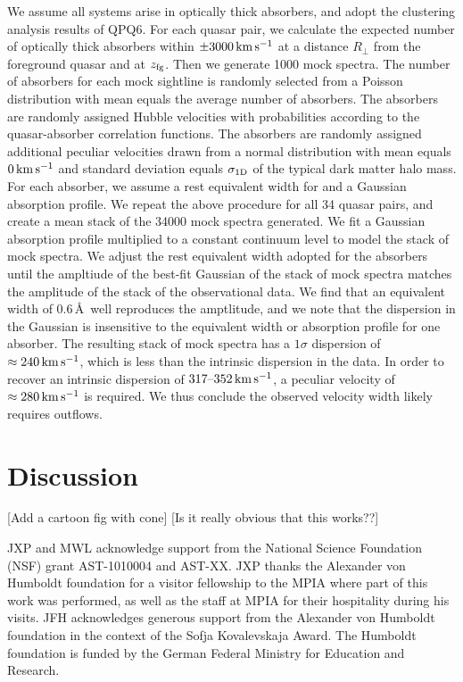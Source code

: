 \documentclass[iop]{emulateapj}
\begin{document}
We assume all  
systems arise in optically thick absorbers, and adopt the clustering analysis results of QPQ6. For 
each quasar pair, we calculate the expected number of optically thick absorbers within 
$\pm3000\,{\rm km\,s^{-1}}$ at a distance $R_\perp$ from the foreground quasar and at 
$z_{\rm fg}$. Then we generate 1000 mock spectra. The number of absorbers for each mock sightline 
is randomly selected from a Poisson distribution with mean equals the average number of absorbers. 
The absorbers are randomly assigned Hubble velocities with probabilities according to the 
quasar-absorber correlation functions. The absorbers are randomly assigned additional peculiar 
velocities drawn from a normal distribution with mean equals $0\,{\rm km\,s^{-1}}$ and standard 
deviation equals $\sigma_{\rm 1D}$ of the typical dark matter halo mass. For each absorber, we 
assume a rest equivalent width for  and a Gaussian absorption profile. We repeat the 
above procedure for all 34 quasar pairs, and create a mean stack of the 34000 mock spectra 
generated. We fit a Gaussian absorption profile multiplied to a constant continuum level to model 
the stack of mock spectra. We adjust the rest equivalent width adopted for the  
absorbers until the ampltiude of the best-fit Gaussian of the stack of mock spectra matches the 
amplitude of the stack of the observational data. We find that an equivalent width of 0.6\,\AA \ 
well reproduces the amptlitude, and we note that the dispersion in the Gaussian is insensitive to 
the equivalent width or absorption profile for one absorber. The resulting stack of mock spectra 
has a $1\sigma$ dispersion of $\approx240\,{\rm km\,s^{-1}}$, which is less than the 
intrinsic dispersion in the data. In order to recover an intrinsic dispersion of 
$317\text{--}352\,{\rm km\,s^{-1}}$, a peculiar velocity of $\approx280\,{\rm km\,s^{-1}}$ is 
required. We thus conclude the observed velocity width likely requires outflows. 

\section{Discussion}
\label{sec:discussion}

[Add a cartoon fig with cone]
[Is it really obvious that this works??]

\acknowledgements

JXP and MWL acknowledge support from the National
Science Foundation (NSF) grant AST-1010004 and AST-XX. 
JXP thanks the Alexander
von Humboldt foundation for a visitor fellowship to the MPIA where
part of this work was performed, as well as the staff at MPIA for
their hospitality during his visits.
JFH acknowledges generous support from the Alexander von Humboldt
foundation in the context of the Sofja Kovalevskaja Award. The
Humboldt foundation is funded by the German Federal Ministry for
Education and Research.  
\end{document}
